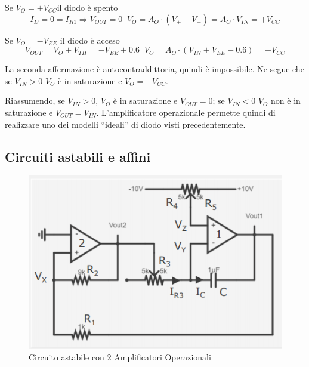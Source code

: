 \documentclass{article}
\begin{document}
\begin{enumerate}
\begin{itemize}
\vspace{2mm}

Se $V_O = +V_{CC}$il diodo è spento 
\[ I_D = 0 = I_{R1} \Rightarrow V_{OUT} = 0 \; \; V_O = A_O \cdot (V_+ - V_-) = A_O \cdot V_{IN} = +V_{CC}\]

Se $V_O = -V_{EE}$ il diodo è acceso 
\[V_{OUT} = V_O + V_{TH} = -V_{EE} + 0.6 \; \; V_O = A_O \cdot (V_{IN} + V_{EE} - 0.6) = +V_{CC}\]

La seconda affermazione è autocontraddittoria, quindi è impossibile. Ne segue che se $V_{IN} > 0$ $V_O$ è in saturazione e $V_O = +V_{CC}$.

\end{itemize}
\end{enumerate}

\vspace{5mm}

Riassumendo, se $V_{IN} > 0$, $V_O$ è in saturazione e $V_{OUT} = 0$; se $V_{IN} < 0$ $V_O$ non è in saturazione e $V_{OUT} = V_{IN}$. L'amplificatore operazionale permette quindi di realizzare uno dei modelli ``ideali'' di diodo visti precedentemente.

\clearpage













\subsection{Circuiti astabili e affini}

\begin{figure}[h]
  \centering
  \includegraphics[scale=0.7]{IM_circuito_astabile}
  \caption{Circuito astabile con 2 Amplificatori Operazionali}
  \label{Schema_circuito_astabile}
\end{figure}
\end{document}
